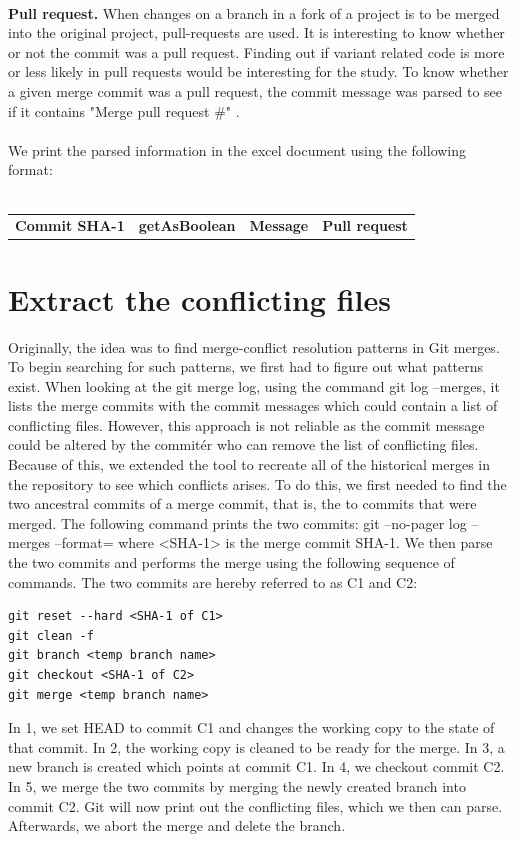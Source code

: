\paragraph*{}
\textbf{Pull request.} When changes on a branch in a fork of a project is to be merged into the original project, pull-requests are used. It is interesting to know whether or not the commit was a pull request. Finding out if variant related code is more or less likely in pull requests would be interesting for the study. To know whether a given merge commit was a pull request, the commit message was parsed to see if it contains "Merge pull request \#" .
\paragraph*{}
We print the parsed information in the excel document using the following format:\\\\
\begin{tabular}{ l l l l}
\hline
\multicolumn{1}{c}{\textbf{Commit SHA-1}} & \multicolumn{1}{c}{\textbf{getAsBoolean}} & \multicolumn{1}{c}{\textbf{Message}} & \multicolumn{1}{c}{\textbf{Pull request}}
\end{tabular}
\section{Extract the conflicting files}
Originally, the idea was to find merge-conflict resolution patterns in Git merges. To begin searching for such patterns, we first had to figure out what patterns exist. When looking at the git merge log, using the command git log --merges, it lists the merge commits with the commit messages which could contain a list of conflicting files. However, this approach is not reliable as the commit message could be altered by the commitér who can remove the list of conflicting files. Because of this, we extended the tool to recreate all of the historical merges in the repository to see which conflicts arises. To do this, we first needed to find the two ancestral commits of a merge commit, that is, the to commits that were merged. The following command prints the two commits:
git --no-pager log --merges --format=%
where <SHA-1> is the merge commit SHA-1. We then parse the two commits and performs the merge using the following sequence of commands. The two commits are hereby referred to as C1 and C2:\\
\lstset{language=Bash}
\begin{lstlisting}[frame=single]
git reset --hard <SHA-1 of C1>
git clean -f
git branch <temp branch name>
git checkout <SHA-1 of C2>
git merge <temp branch name>
\end{lstlisting}
In 1, we set HEAD to commit C1 and changes the working copy to the state of that commit. In 2,  the working copy is cleaned to be ready for the merge. In 3, a new branch is created which points at commit C1. In 4, we checkout commit C2. In 5, we merge the two commits by merging the newly created branch into commit C2. Git will now print out the conflicting files, which we then can parse. Afterwards, we abort the merge and delete the branch.
